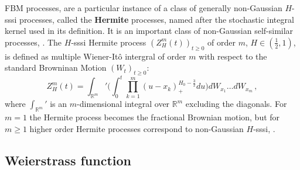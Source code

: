 \documentclass[a4paper]{article}
\newcommand{\Real}{\mathbb{R}}
\begin{document}
FBM processes, are a particular instance of a class of generally non-Gaussian $H$-sssi
processes, called the \textbf{Hermite} processes, named after the stochastic integral
kernel used in its definition. It is an important class of non-Gaussian self-similar
processes, \cite{maejima2007}. The $H$-sssi Hermite process $(Z_H^m(t))_{t\geq 0}$
of order $m$, $H \in (\tfrac{1}{2}, 1)$, is defined as multiple Wiener-It\^o intergral
of order $m$ with respect to the standard Browninan Motion $(W_t)_{t\geq0}$:
\begin{equation}\label{eq:def_hermite}
    Z_H^m(t) = \int_{\Real^m}' \Biggl(
            \int_0^t \prod_{k=1}^m (u - x_k)_+^{H_0-\frac{3}{2}} du
        \Biggr) dW_{x_1} \ldots dW_{x_m}\,,
\end{equation}
where $\int_{\Real^m}'$ is an $m$-dimensional integral over $\Real^m$ excluding the
diagonals. For $m=1$ the Hermite process becomes the fractional Brownian motion,
but for $m\geq 1$ higher order Hermite processes correspond to non-Gaussian $H$-sssi,
\cite{Bai20141710,Chronopoulou:1114288,embrechts2000introduction}.


\subsection{Weierstrass function} %
\label{sub:weierstrass_function}
\end{document}
